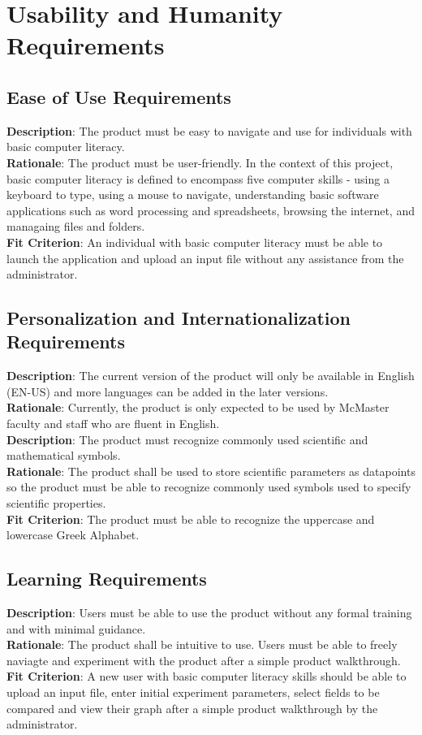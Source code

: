 \documentclass[12pt]{article}
\begin{document}
\section{Usability and Humanity Requirements}
\subsection{Ease of Use Requirements}
\textbf{Description}: The product must be easy to navigate and use for
individuals with basic computer literacy.\\
\textbf{Rationale}: The product must be user-friendly. In the context of this
project, basic computer literacy is defined to encompass five computer skills -
using a keyboard to type, using a mouse to navigate, understanding basic
software applications such as word processing and spreadsheets, browsing the
internet, and managaing files and folders.\\ 
\textbf{Fit Criterion}: An individual with basic computer literacy must be able
to launch the application and upload an input file without any assistance from
the administrator.

\subsection{Personalization and Internationalization Requirements}
\textbf{Description}: The current version of the product will only be available
in English (EN-US) and more languages can be added in the later versions.\\
\textbf{Rationale}: Currently, the product is only expected to be used by
McMaster faculty and staff who are fluent in English.\\
\newline
\textbf{Description}: The product must recognize commonly used scientific and
mathematical symbols.\\
\textbf{Rationale}: The product shall be used to store scientific parameters as
datapoints so the product must be able to recognize commonly used symbols used
to specify scientific properties.\\
\textbf{Fit Criterion}: The product must be able to recognize the uppercase and
lowercase Greek Alphabet.

\subsection{Learning Requirements}
\textbf{Description}: Users must be able to use the product without any formal
training and with minimal guidance.\\
\textbf{Rationale}: The product shall be intuitive to use. Users must be able to
freely naviagte and experiment with the product after a simple product
walkthrough.\\
\textbf{Fit Criterion}: A new user with basic computer literacy skills should be
able to upload an input file, enter initial experiment parameters, select fields
to be compared and view their graph after a simple product walkthrough by the
administrator.
\end{document}

